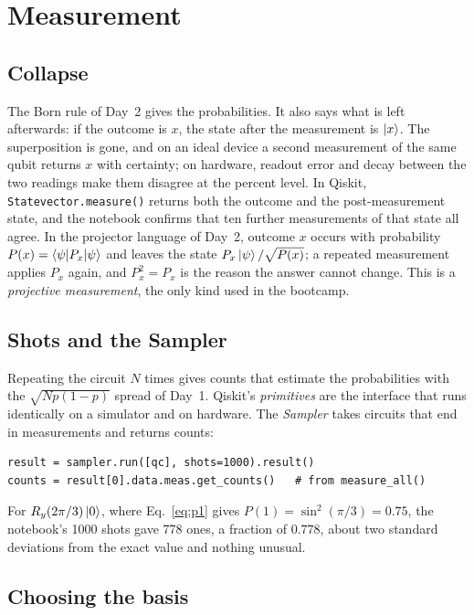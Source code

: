 \documentclass[11pt]{article}
\newcommand{\code}[1]{\texttt{#1}}
\begin{document}
\section{Measurement}

\subsection{Collapse}

The Born rule of Day~2 gives the probabilities. It also says what is left afterwards: if the outcome is $x$, the state after the measurement is $\ket{x}$. The superposition is gone, and on an ideal device a second measurement of the same qubit returns $x$ with certainty; on hardware, readout error and decay between the two readings make them disagree at the percent level. In Qiskit, \code{Statevector.measure()} returns both the outcome and the post-measurement state, and the notebook confirms that ten further measurements of that state all agree. In the projector language of Day~2, outcome $x$ occurs with probability $P(x) = \braket{\psi|P_x|\psi}$ and leaves the state $P_x\ket{\psi}/\sqrt{P(x)}$; a repeated measurement applies $P_x$ again, and $P_x^2 = P_x$ is the reason the answer cannot change. This is a \emph{projective measurement}, the only kind used in the bootcamp.

\subsection{Shots and the Sampler}

Repeating the circuit $N$ times gives counts that estimate the probabilities with the $\sqrt{Np(1-p)}$ spread of Day~1. Qiskit's \emph{primitives} are the interface that runs identically on a simulator and on hardware. The \emph{Sampler} takes circuits that end in measurements and returns counts:
\begin{lstlisting}
result = sampler.run([qc], shots=1000).result()
counts = result[0].data.meas.get_counts()   # from measure_all()
\end{lstlisting}
For $R_y(2\pi/3)\ket{0}$, where Eq.~\eqref{eq:p1} gives $P(1) = \sin^2(\pi/3) = 0.75$, the notebook's 1000 shots gave 778 ones, a fraction of $0.778$, about two standard deviations from the exact value and nothing unusual.

\subsection{Choosing the basis}
\end{document}
